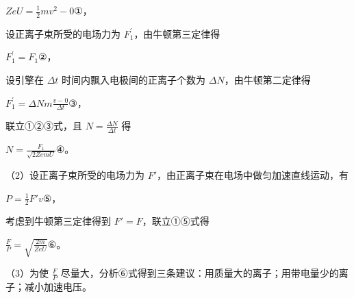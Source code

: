 \documentclass[\gkver]{gaokaozhenti}
\begin{document}
\begin{enumerate}
{$ZeU = \frac{1}{2}mv^{2} - 0$①，

设正离子束所受的电场力为 $F_{1}^{\prime}$，由牛顿第三定律得

$F_{1}^{\prime}=F_{1}$②，

设引擎在 $\Delta t$ 时间内飘入电极间的正离子个数为 $\Delta N$，由牛顿第二定律得

$F_{1}^{\prime}=\Delta Nm\frac{v-0}{\Delta t}$③，

联立①②③式，且 $N=\frac{\Delta N}{\Delta t}$ 得

$N=\frac{F_{1}}{\sqrt{2ZemU}}$④。

（2）设正离子束所受的电场力为 $F'$，由正离子束在电场中做匀加速直线运动，有

$P = \frac{1}{2} F' v$⑤，

考虑到牛顿第三定律得到 $F' = F$，联立①⑤式得

$\frac{F}{P} = \sqrt{\frac{2m}{ZeU}}$⑥。

（3）为使 $\frac{F}{P}$ 尽量大，分析⑥式得到三条建议：用质量大的离子；用带电量少的离子；减小加速电压。
}

\end{enumerate}
\end{document}
